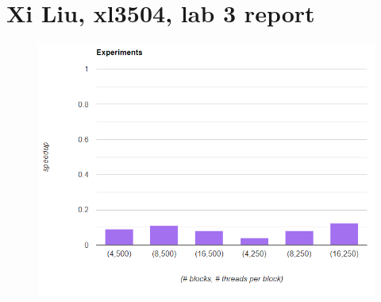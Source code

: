 \documentclass[12pt,border=4pt,multi]{article} %
\begin{document}
\section*{Xi Liu, xl3504, lab 3 report}

\begin{figure}[h!]
	\centering
	\includegraphics[width=1.1\textwidth, height=\textwidth]{1} %
\end{figure}
\end{document}
